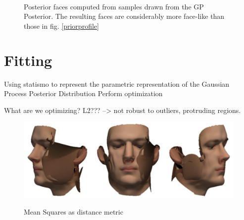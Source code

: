 \begin{figure}[h]
\centering
{}\\
\label{fig:posteriorsample}
\caption{Posterior faces computed from samples drawn from the GP Posterior. The resulting faces are considerably more face-like than those in fig. \ref{priorprofile}}
\end{figure}

\section{Fitting}
Using statismo to represent the parametric representation of the Gaussian Process Posterior Distribution
Perform optimization

What are we optimizing? L2??? --> not robust to outliers, protruding regions.
\begin{figure}[h!]
\centering
\includegraphics[width=.8\textwidth]{./resources/img/00029_meansquares_fit.pdf}
\label{fig:msquaresfit}
\caption{Mean Squares as distance metric}
\end{figure}

